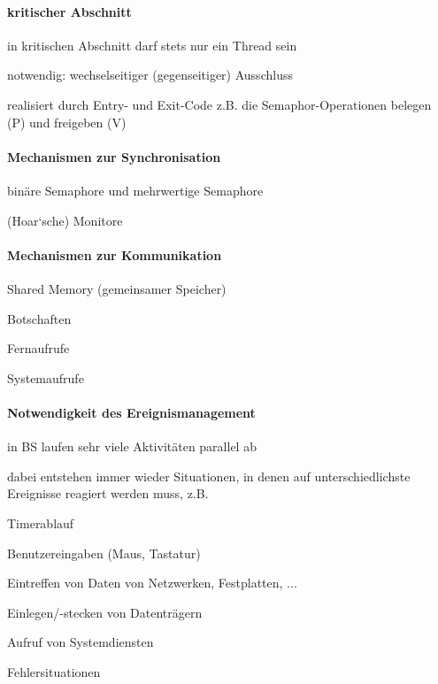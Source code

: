 \documentclass[a4paper]{article}
\begin{document}
\begin{multicols}{3}
  \paragraph{kritischer Abschnitt}
  \begin{itemize*}
    \item in kritischen Abschnitt darf stets nur ein Thread sein
    \item notwendig: wechselseitiger (gegenseitiger) Ausschluss
    \item realisiert durch Entry- und Exit-Code z.B. die Semaphor-Operationen belegen (P) und freigeben (V)
  \end{itemize*}

  \paragraph{Mechanismen zur Synchronisation}
  \begin{itemize*}
    \item binäre Semaphore und mehrwertige Semaphore
    \item (Hoar‘sche) Monitore
  \end{itemize*}

  \paragraph{Mechanismen zur Kommunikation}
  \begin{itemize*}
    \item Shared Memory (gemeinsamer Speicher)
    \item Botschaften
    \item Fernaufrufe
    \item Systemaufrufe
  \end{itemize*}

  \paragraph{Notwendigkeit des Ereignismanagement}
  \begin{itemize*}
    \item in BS laufen sehr viele Aktivitäten parallel ab
    \item dabei entstehen immer wieder Situationen, in denen auf unterschiedlichste Ereignisse reagiert werden muss, z.B.
    \begin{itemize*}
      \item Timerablauf
      \item Benutzereingaben (Maus, Tastatur)
      \item Eintreffen von Daten von Netzwerken, Festplatten, ...
      \item Einlegen/-stecken von Datenträgern
      \item Aufruf von Systemdiensten
      \item Fehlersituationen
    \end{itemize*}
  \end{itemize*}


\end{multicols}
\end{document}
